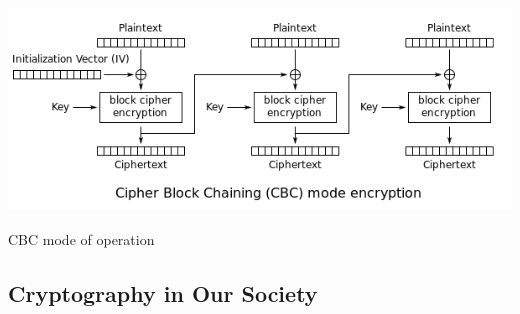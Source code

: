 \documentclass[12pt]{beamer}
\begin{document}
\begin{frame}
\begin{center}
\includegraphics[scale=0.5]{CBC.PNG}
\break
\caption{CBC mode of operation\cite{tux}}
\end{center}
\end{frame}

\subsection{Cryptography in Our Society}
\end{document}
